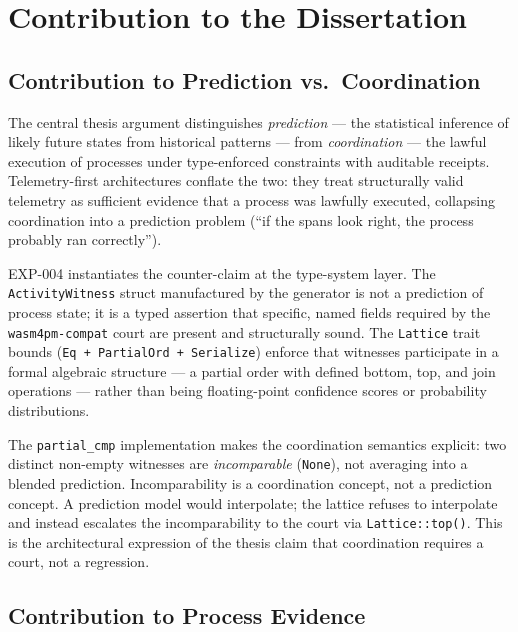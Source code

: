 
\section{Contribution to the Dissertation}
\label{sec:otel-weaver-exp-004-registry-to-witness-contribution}

\subsection{Contribution to Prediction vs.~Coordination}
\label{sec:otel-weaver-exp-004-registry-to-witness-prediction}

The central thesis argument distinguishes \emph{prediction} --- the statistical inference
of likely future states from historical patterns --- from \emph{coordination} --- the
lawful execution of processes under type-enforced constraints with auditable receipts.
Telemetry-first architectures conflate the two: they treat structurally valid telemetry
as sufficient evidence that a process was lawfully executed, collapsing coordination into
a prediction problem (``if the spans look right, the process probably ran correctly'').

EXP-004 instantiates the counter-claim at the type-system layer. The \texttt{ActivityWitness}
struct manufactured by the generator is not a prediction of process state; it is a
typed assertion that specific, named fields required by the \texttt{wasm4pm-compat} court
are present and structurally sound. The \texttt{Lattice} trait bounds
(\texttt{Eq + PartialOrd + Serialize}) enforce that witnesses participate in a formal
algebraic structure --- a partial order with defined bottom, top, and join operations ---
rather than being floating-point confidence scores or probability distributions.

The \texttt{partial\_cmp} implementation makes the coordination semantics explicit: two
distinct non-empty witnesses are \emph{incomparable} (\texttt{None}), not averaging into
a blended prediction. Incomparability is a coordination concept, not a prediction concept.
A prediction model would interpolate; the lattice refuses to interpolate and instead
escalates the incomparability to the court via \texttt{Lattice::top()}. This is the
architectural expression of the thesis claim that coordination requires a court, not a
regression.

\subsection{Contribution to Process Evidence}
\label{sec:otel-weaver-exp-004-registry-to-witness-process-evidence}


